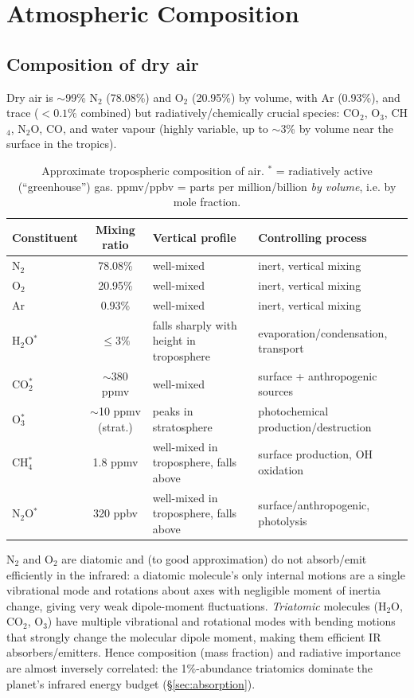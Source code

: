 \documentclass[11pt]{article}
\begin{document}
\section{Atmospheric Composition}
\label{sec:composition}

\subsection{Composition of dry air}
Dry air is $\sim$99\% N$_2$ (78.08\%) and O$_2$ (20.95\%) by volume, with Ar (0.93\%), and trace ($<0.1\%$ combined) but radiatively/chemically crucial species: CO$_2$, O$_3$, CH$_4$, N$_2$O, CO, and water vapour (highly variable, up to $\sim$3\% by volume near the surface in the tropics).

\begin{table}[h!]
\centering
\small
\begin{tabular}{@{}lcp{4.3cm}p{4.3cm}@{}}
\toprule
Constituent & Mixing ratio & Vertical profile & Controlling process \\
\midrule
N$_2$ & 78.08\% & well-mixed & inert, vertical mixing \\
O$_2$ & 20.95\% & well-mixed & inert, vertical mixing \\
Ar & 0.93\% & well-mixed & inert, vertical mixing \\
H$_2$O$^*$ & $\le 3\%$ & falls sharply with height in troposphere & evaporation/condensation, transport \\
CO$_2^*$ & $\sim$380 ppmv & well-mixed & surface + anthropogenic sources \\
O$_3^*$ & $\sim$10 ppmv (strat.) & peaks in stratosphere & photochemical production/destruction \\
CH$_4^*$ & 1.8 ppmv & well-mixed in troposphere, falls above & surface production, OH oxidation \\
N$_2$O$^*$ & 320 ppbv & well-mixed in troposphere, falls above & surface/anthropogenic, photolysis \\
\bottomrule
\end{tabular}
\caption{Approximate tropospheric composition of air. $^*$ = radiatively active (``greenhouse'') gas. ppmv/ppbv = parts per million/billion \emph{by volume}, i.e. by mole fraction.}
\end{table}

\begin{intuition}
N$_2$ and O$_2$ are diatomic and (to good approximation) do not absorb/emit efficiently in the infrared: a diatomic molecule's only internal motions are a single vibrational mode and rotations about axes with negligible moment of inertia change, giving very weak dipole-moment fluctuations. \emph{Triatomic} molecules (H$_2$O, CO$_2$, O$_3$) have multiple vibrational and rotational modes with bending motions that strongly change the molecular dipole moment, making them efficient IR absorbers/emitters. Hence composition (mass fraction) and radiative importance are almost inversely correlated: the 1\%-abundance triatomics dominate the planet's infrared energy budget (\S\ref{sec:absorption}).
\end{intuition}
\end{document}
